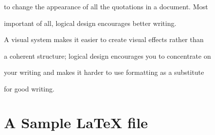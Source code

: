 to change the appearance of all the quotations in a document.  Most

important of all, logical design encourages better writing.

A visual system makes it easier to create visual effects rather than

a coherent structure; logical design encourages you to concentrate on

your writing and makes it harder to use formatting as a substitute

for good writing.



\section{A Sample \LaTeX{} file}



